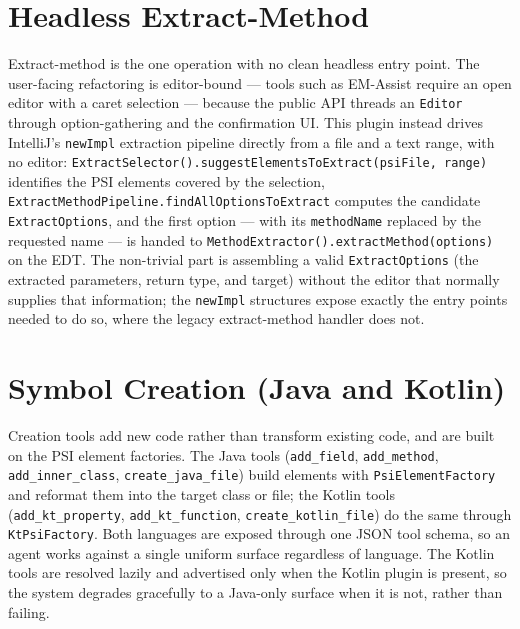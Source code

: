 \section{Headless Extract-Method}
\label{sec:impl-extract}
Extract-method is the one operation with no clean headless entry point. The
user-facing refactoring is editor-bound --- tools such as EM-Assist require an open
editor with a caret selection --- because the public API threads an \texttt{Editor}
through option-gathering and the confirmation UI. This plugin instead drives IntelliJ's
\texttt{newImpl} extraction pipeline directly from a file and a text range, with no
editor: \texttt{ExtractSelector().suggestElementsToExtract(psiFile, range)} identifies
the PSI elements covered by the selection, \texttt{ExtractMethodPipeline.findAllOptionsToExtract}
computes the candidate \texttt{ExtractOptions}, and the first option --- with its
\texttt{methodName} replaced by the requested name --- is handed to
\texttt{MethodExtractor().extractMethod(options)} on the EDT. The non-trivial part is
assembling a valid \texttt{ExtractOptions} (the extracted parameters, return type, and
target) without the editor that normally supplies that information; the \texttt{newImpl}
structures expose exactly the entry points needed to do so, where the legacy
extract-method handler does not.

\section{Symbol Creation (Java and Kotlin)}
\label{sec:impl-create}
Creation tools add new code rather than transform existing code, and are built on the
PSI element factories. The Java tools (\texttt{add\_field}, \texttt{add\_method},
\texttt{add\_inner\_class}, \texttt{create\_java\_file}) build elements with
\texttt{PsiElementFactory} and reformat them into the target class or file; the Kotlin
tools (\texttt{add\_kt\_property}, \texttt{add\_kt\_function},
\texttt{create\_kotlin\_file}) do the same through \texttt{KtPsiFactory}. Both languages
are exposed through one JSON tool schema, so an agent works against a single uniform
surface regardless of language. The Kotlin tools are resolved lazily and advertised only
when the Kotlin plugin is present, so the system degrades gracefully to a Java-only
surface when it is not, rather than failing.

